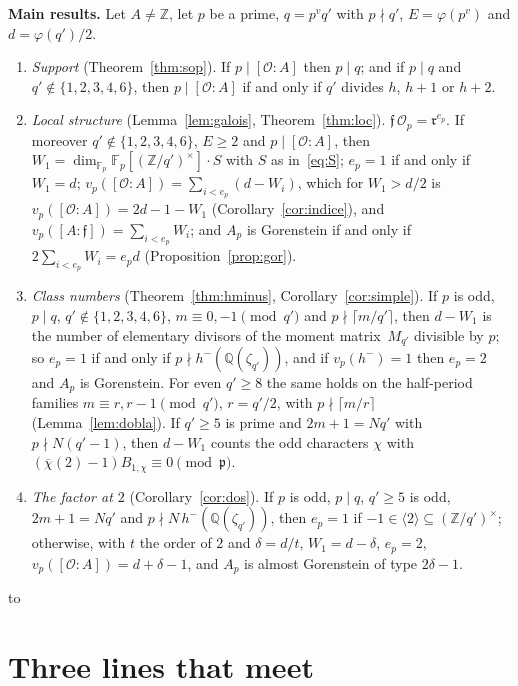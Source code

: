 \documentclass[11pt,a4paper]{article}
\theoremstyle{definition}
\newcommand{\ZZ}{\mathbb{Z}}
\newcommand{\QQ}{\mathbb{Q}}
\newcommand{\FF}{\mathbb{F}}
\newcommand{\cO}{\mathcal{O}}
\newcommand{\cf}{\mathfrak{f}}
\newcommand{\rad}{\mathfrak{r}}
\newenvironment{keybox}
  {\par\vspace{9pt}\begin{lrbox}{\fichabox}%
   \begin{minipage}{0.90\textwidth}\vspace{7pt}\setlength{\parskip}{3pt}}
  {\vspace{7pt}\end{minipage}\end{lrbox}%
   \par\needspace{\dimexpr\ht\fichabox+\dp\fichabox+12pt\relax}\noindent\hbox to \textwidth{\hfill
   \textcolor{azul}{\rule[-\dp\fichabox]{3.2pt}{\dimexpr\ht\fichabox+\dp\fichabox\relax}}%
   \colorbox{fondoficha}{\usebox{\fichabox}}\hfill}%
   \par\vspace{9pt}}
\begin{document}
\begin{keybox}
\noindent\textbf{Main results.} Let $A\ne\ZZ$, let $p$ be a prime, $q=p^vq'$ with $p\nmid q'$, $E=\varphi(p^v)$ and
$d=\varphi(q')/2$.
\begin{enumerate}
\item[(1)] \emph{Support} (Theorem~\ref{thm:sop}). If $p\mid[\cO:A]$ then $p\mid q$; and if $p\mid q$ and
 $q'\notin\{1,2,3,4,6\}$, then $p\mid[\cO:A]$ if and only if $q'$ divides $h$, $h+1$ or $h+2$.
\item[(2)] \emph{Local structure} (Lemma~\ref{lem:galois}, Theorem~\ref{thm:loc}). $\cf\,\cO_p=\rad^{e_p}$. If moreover
 $q'\notin\{1,2,3,4,6\}$, $E\ge2$ and $p\mid[\cO:A]$, then $W_1=\dim_{\FF_p}\FF_p[(\ZZ/q')^\times]\cdot S$ with $S$ as in~\eqref{eq:S}; $e_p=1$ if
 and only if $W_1=d$; $v_p([\cO:A])=\sum_{i<e_p}(d-W_i)$, which for $W_1>d/2$ is $v_p([\cO:A])=2d-1-W_1$
 (Corollary~\ref{cor:indice}), and $v_p([A:\cf])=\sum_{i<e_p}W_i$; and $A_p$ is
 Gorenstein if and only if $2\sum_{i<e_p}W_i=e_pd$ (Proposition~\ref{prop:gor}).
\item[(3)] \emph{Class numbers} (Theorem~\ref{thm:hminus}, Corollary~\ref{cor:simple}). If $p$ is odd, $p\mid q$,
 $q'\notin\{1,2,3,4,6\}$, $m\equiv0,-1\pmod{q'}$ and $p\nmid\lceil m/q'\rceil$, then $d-W_1$ is the
 number of elementary divisors of the moment matrix~$M_{q'}$ divisible by $p$; so $e_p=1$ if and only if
 $p\nmid h^-(\QQ(\zeta_{q'}))$, and if $v_p(h^-)=1$ then $e_p=2$ and $A_p$ is Gorenstein. For even $q'\ge8$ the same holds
 on the half-period families $m\equiv r,r-1\pmod{q'}$, $r=q'/2$, with $p\nmid\lceil m/r\rceil$ (Lemma~\ref{lem:dobla}). If $q'\ge5$ is prime and
 $2m+1=Nq'$ with $p\nmid N(q'-1)$, then $d-W_1$ counts the odd characters $\chi$ with $(\overline\chi(2)-1)B_{1,\chi}\equiv0\pmod{\mathfrak p}$.
\item[(4)] \emph{The factor at $2$} (Corollary~\ref{cor:dos}). If $p$ is odd, $p\mid q$, $q'\ge5$ is odd, $2m+1=Nq'$ and
 $p\nmid N\,h^-(\QQ(\zeta_{q'}))$, then $e_p=1$ if $-1\in\langle2\rangle\subseteq(\ZZ/q')^\times$; otherwise, with $t$ the
 order of $2$ and $\delta=d/t$, $W_1=d-\delta$, $e_p=2$, $v_p([\cO:A])=d+\delta-1$, and $A_p$ is almost Gorenstein of
 type $2\delta-1$.
\end{enumerate}
\end{keybox}

\section{Three lines that meet}\label{sec:historia}
\end{document}
